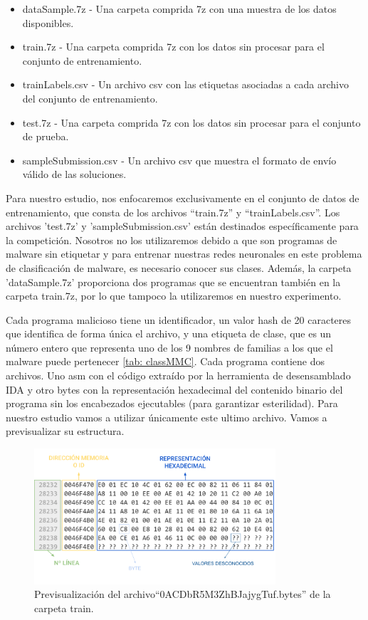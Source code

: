 \begin{itemize}
\item dataSample.7z - Una carpeta comprida 7z con una muestra de los datos disponibles.
\item train.7z - Una carpeta comprida 7z con los datos sin procesar para el conjunto de entrenamiento.
\item trainLabels.csv - Un archivo csv con las etiquetas asociadas a cada archivo del conjunto de entrenamiento.
\item test.7z - Una carpeta comprida 7z con los datos sin procesar para el conjunto de prueba.
\item sampleSubmission.csv - Un archivo csv que muestra el formato de envío válido de las soluciones.
\end{itemize}

Para nuestro estudio, nos enfocaremos exclusivamente en el conjunto de datos de entrenamiento, que consta de los archivos ``train.7z'' y ``trainLabels.csv''. Los archivos 'test.7z' y 'sampleSubmission.csv' están destinados específicamente para la competición. Nosotros no los utilizaremos debido a que son programas de malware sin etiquetar y para entrenar nuestras redes neuronales en este problema de clasificación de malware, es necesario conocer sus clases.  Además, la carpeta 'dataSample.7z' proporciona dos programas que se encuentran también en la carpeta train.7z, por lo que tampoco la utilizaremos en nuestro experimento. 



Cada programa malicioso tiene un identificador, un valor hash de 20 caracteres que identifica de forma única el archivo, y una etiqueta de clase, que es un número entero que representa uno de los 9 nombres de familias a los que el malware puede pertenecer \ref{tab: classMMC}. Cada programa contiene dos archivos.  Uno asm con el código extraído por la herramienta de desensamblado IDA y otro bytes con la representación hexadecimal del contenido binario del programa sin los encabezados ejecutables (para garantizar esterilidad). Para nuestro estudio vamos a utilizar únicamente este ultimo archivo. Vamos a previsualizar su estructura.

\begin{figure}[h]
    \begin{center}
    \includegraphics[width=0.8\textwidth]{img/previewMMC.png}
    \end{center}
    \caption{Previsualización del archivo``0ACDbR5M3ZhBJajygTuf.bytes'' de la carpeta train.}
    \label{fig:previewMMC}
\end{figure} 

